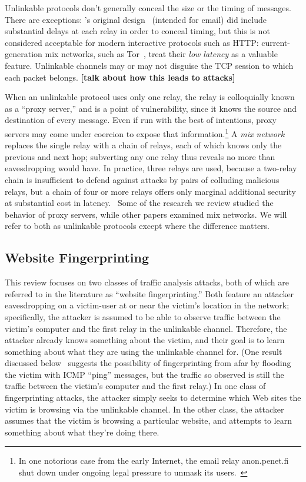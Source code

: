 \documentclass{zarticle}
\def\todo#1{{\color{todocolor}\bfseries [#1]}}
\begin{document}
Unlinkable protocols don't generally conceal the size or the timing of
messages.  There are exceptions: \citeauthor{chaum1981mix}'s original
design~\cite{chaum1981mix} (intended for email) did include
substantial delays at each relay in order to conceal timing, but this
is not considered acceptable for modern interactive protocols such as
HTTP: current-generation mix networks, such as
Tor~\cite{dingledine2004tor}, treat their \emph{low latency} as a
valuable feature.  Unlinkable channels may or may not disguise the TCP
session to which each packet belongs. \todo{talk about how this leads
  to attacks}

When an unlinkable protocol uses only one relay, the relay is
colloquially known as a “proxy server,” and is a point of
vulnerability, since it knows the source and destination of every
message.  Even if run with the best of intentions, proxy servers may
come under coercion to expose that information.\footnote{In one
  notorious case from the early Internet, the email relay
  \textsf{anon.penet.fi} shut down under ongoing legal pressure to
  unmask its users.~\cite{newman1996church}} A \emph{mix
  network}~\cite{chaum1981mix} replaces the single relay with a chain
of relays, each of which knows only the previous and next hop;
subverting any one relay thus reveals no more than eavesdropping would
have.  In practice, three relays are used, because a two-relay chain
is insufficient to defend against attacks by pairs of colluding
malicious relays, but a chain of four or more relays offers only
marginal additional security at substantial cost in
latency.~\cite{wright2002analysis,wright2003defending} Some of the
research we review studied the behavior of proxy servers, while other
papers examined mix networks.  We will refer to both as unlinkable
protocols except where the difference matters.

\subsection{Website Fingerprinting}

This review focuses on two classes of traffic analysis attacks, both
of which are referred to in the literature as “website
fingerprinting.”  Both feature an attacker eavesdropping on a
victim-user at or near the victim's location in the network;
specifically, the attacker is assumed to be able to observe traffic
between the victim's computer and the first relay in the unlinkable
channel.  Therefore, the attacker already knows something about the
victim, and their goal is to learn something about what they are using
the unlinkable channel for.  (One result discussed
below~\cite{gong2011remote} suggests the possibility of fingerprinting
from afar by flooding the victim with ICMP “ping” messages, but the
traffic so observed is still the traffic between the victim's computer
and the first relay.)  In one class of fingerprinting attacks, the
attacker simply seeks to determine which Web sites the victim is
browsing via the unlinkable channel.  In the other class, the attacker
assumes that the victim is browsing a particular website, and attempts
to learn something about what they're doing there.
\end{document}
